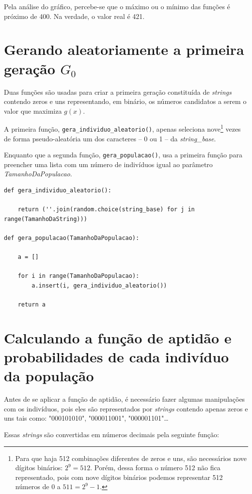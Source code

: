 \documentclass[11pt]{article}
\begin{document}
Pela análise do gráfico, percebe-se que o máximo ou o mínimo das funções é próximo de 400. Na verdade, o valor real é 421.

\section{Gerando aleatoriamente a primeira geração $G_0$}

Duas funções são usadas para criar a primeira geração constituída de \emph{strings} contendo zeros e uns representando, em binário, os números candidatos a serem o valor que maximiza $g(x)$.

A primeira função, \texttt{gera\_individuo\_aleatorio()}, apenas seleciona nove\footnote{Para que haja 512 combinações diferentes de zeros e uns, são necessários nove dígitos binários: $2^9 = 512$. Porém, dessa forma o número 512 não fica representado, pois com nove dígitos binários podemos representar 512 números de 0 a $511 = 2^9 - 1$.} vezes de forma pseudo-aleatória um dos caracteres -- 0 ou 1 -- da \emph{string\_base}.

Enquanto que a segunda função, \texttt{gera\_populacao()}, usa a primeira função para preencher uma lista com um número de indivíduos igual ao parâmetro \emph{TamanhoDaPopulacao}.

\begin{lstlisting}
def gera_individuo_aleatorio():
	
	return (''.join(random.choice(string_base) for j in range(TamanhoDaString)))

def gera_populacao(TamanhoDaPopulacao):
	
	a = []
	
	for i in range(TamanhoDaPopulacao):
		a.insert(i, gera_individuo_aleatorio())
	
	return a
\end{lstlisting}

\section{Calculando a função de aptidão e probabilidades de cada indivíduo da população}

Antes de se aplicar a função de aptidão, é necessário fazer algumas manipulações com os indivíduos, pois eles são representados por \emph{strings} contendo apenas zeros e uns tais como: "000101010", "000011001",  "000001101"\ldots

Essas \emph{strings} são convertidas em números decimais pela seguinte função:
\end{document}
